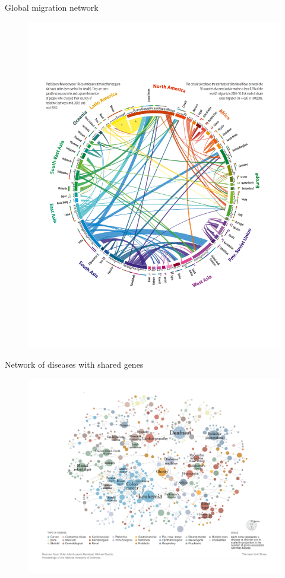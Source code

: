 \documentclass[10pt]{beamer}
\begin{document}
\begin{frame}{Global migration network}
	\begin{figure}
	\centering
	\includegraphics[scale=0.4]{Figs/mig}
	\end{figure}
\end{frame}

\begin{frame}{Network of diseases with shared genes}
	\begin{figure}
	\centering
	\includegraphics[scale=0.4]{Figs/nyt}
	\end{figure}
\end{frame}
\end{document}
